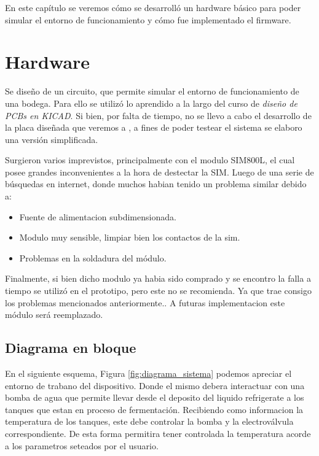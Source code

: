 En este capítulo se veremos cómo se desarrolló un hardware básico para poder simular el entorno de funcionamiento y cómo fue implementado el firmware.

\section{Hardware}

Se diseño de un circuito, que permite simular el entorno de funcionamiento de una bodega. Para ello se utilizó lo aprendido a la largo del curso de \emph{diseño de PCBs en KICAD}. Si bien, por falta de tiempo, no se llevo a cabo el desarrollo de la placa diseñada que veremos a , a fines de poder testear el sistema se elaboro una versión simplificada. 

Surgieron varios imprevistos, principalmente con el modulo SIM800L, el cual posee grandes inconvenientes a la hora de destectar la SIM. Luego de una serie de búsquedas en internet, donde muchos habian tenido un problema similar debido a:
\begin{itemize}
  \item Fuente de alimentacion subdimensionada.
  \item Modulo muy sensible, limpiar bien los contactos de la sim.
  \item Problemas en la soldadura del módulo.
\end{itemize}
Finalmente, si bien dicho modulo ya habia sido comprado y se encontro la falla a tiempo se utilizó en el prototipo, pero este no se recomienda. Ya que trae consigo los problemas mencionados anteriormente.. A futuras implementacion este módulo será reemplazado.


\subsection{Diagrama en bloque}
En el siguiente esquema, Figura \ref{fig:diagrama_sistema} podemos apreciar el entorno de trabano del dispositivo. Donde el mismo debera interactuar con una bomba de agua que permite llevar desde el deposito del liquido refrigerate a los tanques que estan en proceso de fermentación.
Recibiendo como informacion la temperatura de los tanques, este debe controlar la bomba y la electroválvula correspondiente. De esta forma permitira tener controlada la temperatura acorde a los parametros seteados por el usuario. 


